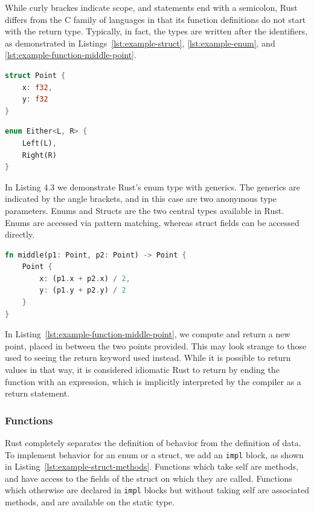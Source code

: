 \documentclass{article}
\begin{document}
While curly brackes indicate scope, and statements end with a semicolon, Rust differs from the C family of languages in that its function definitions do not start with the return type. Typically, in fact, the types are written after the identifiers, as demonstrated in Listings~\ref{lst:example-struct}, \ref{lst:example-enum}, and \ref{lst:example-function-middle-point}.

\begin{lstlisting}[language=Rust, style=boxed, caption=The type definition for a point in two-dimensional space, label=lst:example-struct]
struct Point {
    x: f32,
    y: f32
}
\end{lstlisting}

\begin{lstlisting}[language=Rust, style=boxed, caption=A generic Rust enum, label=lst:example-enum]
enum Either<L, R> {
    Left(L),
    Right(R)
}
\end{lstlisting}

In Listing 4.3 we demonstrate Rust's enum type with generics. The generics are indicated by the angle brackets, and in this case are two anonymous type parameters.
Enums and Structs are the two central types available in Rust. Enums are accessed via pattern matching, whereas struct fields can be accessed directly.

\begin{lstlisting}[language=Rust, style=boxed, caption=A function to compute the point between two points in two-dimensional space, label=lst:example-function-middle-point]
fn middle(p1: Point, p2: Point) -> Point {
    Point {
        x: (p1.x + p2.x) / 2,
        y: (p1.y + p2.y) / 2
    }
}
\end{lstlisting}

In Listing~\ref{lst:example-function-middle-point}, we compute and return a new point, placed in between the two points provided. This may look strange to those used to seeing the return keyword used instead. While it is possible to return values in that way, it is considered idiomatic Rust to return by ending the function with an expression, which is implicitly interpreted by the compiler as a return statement.

\subsubsection{Functions}
Rust completely separates the definition of behavior from the definition of data. To implement behavior for an enum or a struct, we add an \lstinline{impl} block, as shown in Listing~\ref{lst:example-struct-methods}. Functions which take self are methods, and have access to the fields of the struct on which they are called. Functions which otherwise are declared in \lstinline{impl} blocks but without taking self are associated methods, and are available on the static type.
\end{document}
